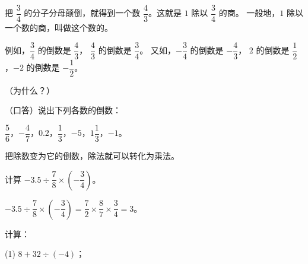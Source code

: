 \begin{enhancedline}

\lianxi
\begin{xiaotis}



\end{xiaotis}


把 $\dfrac{3}{4}$ 的分子分母颠倒，就得到一个数 $\dfrac{4}{3}$。这就是 $1$ 除以 $\dfrac{3}{4}$ 的商。
一般地，$1$ 除以一个数的商，叫做这个数的。

例如，$\dfrac{3}{4}$ 的倒数是 $\dfrac{4}{3}$， $\dfrac{4}{3}$ 的倒数是 $\dfrac{3}{4}$。
又如，$-\dfrac{3}{4}$ 的倒数是 $-\dfrac{4}{3}$， $2$ 的倒数是 $\dfrac{1}{2}$，$-2$ 的倒数是 $-\dfrac{1}{2}$。

（为什么？）

\lianxi

（口答）说出下列各数的倒数：

\hspace*{2em} $\dfrac{5}{6}$，\quad  $-\dfrac{4}{7}$，\quad $0.2$，\quad $\dfrac{1}{3}$，\quad $-5$，\quad $1\dfrac{1}{3}$，\quad $-1$。

\lianxijiange


把除数变为它的倒数，除法就可以转化为乘法。

\liti 计算 $-3.5 \div \dfrac{7}{8} \times \left(-\dfrac{3}{4}\right)$。

\jie $-3.5 \div \dfrac{7}{8} \times \left(-\dfrac{3}{4}\right) = \dfrac{7}{2} \times \dfrac{8}{7} \times \dfrac{3}{4} = 3$。

\liti 计算：

(1) \; $8 + 32 \div (-4)$；


\end{enhancedline}
